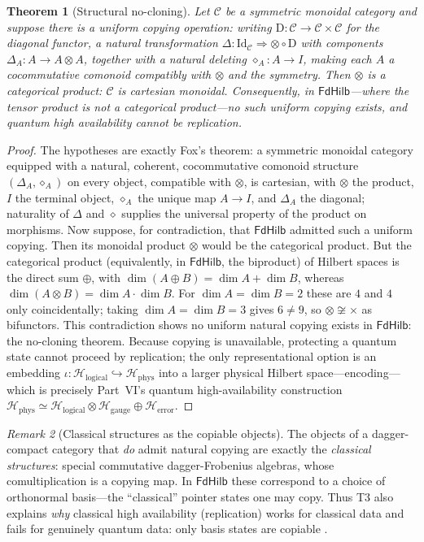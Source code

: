 \documentclass[12pt]{article}
\newtheorem{theorem}{Theorem}[section]
\theoremstyle{definition}
\theoremstyle{remark}
\newtheorem{remark}[theorem]{Remark}
\newcommand{\FdHilb}{\mathsf{FdHilb}}
\begin{document}
\begin{theorem}[Structural no-cloning]
\label{thm:nocloning}
Let $\mathcal{C}$ be a symmetric monoidal category and suppose there is a
\emph{uniform} copying operation: writing $\mathrm{D}:\mathcal{C}\to
\mathcal{C}\times\mathcal{C}$ for the diagonal functor, a natural transformation
$\Delta:\mathrm{Id}_{\mathcal{C}}\Rightarrow\otimes\circ\mathrm{D}$ with
components $\Delta_A:A\to A\otimes A$, together with a natural deleting
$\diamond_A:A\to I$, making each $A$ a cocommutative comonoid compatibly with
$\otimes$ and the symmetry. Then $\otimes$ is a categorical product: $\mathcal{C}$
is cartesian monoidal. Consequently, in $\FdHilb$---where the tensor product is
\emph{not} a categorical product---no such uniform copying exists, and quantum
high availability cannot be replication.
\end{theorem}

\begin{proof}
The hypotheses are exactly Fox's theorem: a symmetric monoidal category equipped
with a natural, coherent, cocommutative comonoid structure
$(\Delta_A,\diamond_A)$ on every object, compatible with $\otimes$, is cartesian,
with $\otimes$ the product, $I$ the terminal object, $\diamond_A$ the unique map
$A\to I$, and $\Delta_A$ the diagonal; naturality of $\Delta$ and $\diamond$
supplies the universal property of the product on morphisms. Now suppose, for
contradiction, that $\FdHilb$ admitted such a uniform copying. Then its monoidal
product $\otimes$ would be the categorical product. But the categorical product
(equivalently, in $\FdHilb$, the biproduct) of Hilbert spaces is the direct sum
$\oplus$, with $\dim(A\oplus B)=\dim A+\dim B$, whereas
$\dim(A\otimes B)=\dim A\cdot\dim B$. For $\dim A=\dim B=2$ these are $4$ and $4$
only coincidentally; taking $\dim A=\dim B=3$ gives $6\ne 9$, so
$\otimes\not\cong\times$ as bifunctors. This contradiction shows no uniform
natural copying exists in $\FdHilb$: the no-cloning theorem. Because copying is
unavailable, protecting a quantum state cannot proceed by replication; the only
representational option is an embedding
$\iota:\mathcal{H}_{\mathrm{logical}}\hookrightarrow\mathcal{H}_{\mathrm{phys}}$
into a larger physical Hilbert space---encoding---which is precisely Part~VI's
quantum high-availability construction
$\mathcal{H}_{\mathrm{phys}}\simeq
\mathcal{H}_{\mathrm{logical}}\otimes\mathcal{H}_{\mathrm{gauge}}
\oplus\mathcal{H}_{\mathrm{error}}$.
\end{proof}

\begin{remark}[Classical structures as the copiable objects]
\label{rem:classical}
The objects of a dagger-compact category that \emph{do} admit natural copying are
exactly the \emph{classical structures}: special commutative dagger-Frobenius
algebras, whose comultiplication is a copying map. In $\FdHilb$ these correspond
to a choice of orthonormal basis---the ``classical'' pointer states one may copy.
Thus T3 also explains \emph{why} classical high availability (replication) works
for classical data and fails for genuinely quantum data: only basis states are
copiable \cite{AbramskyCoecke2004}.
\end{remark}
\end{document}
